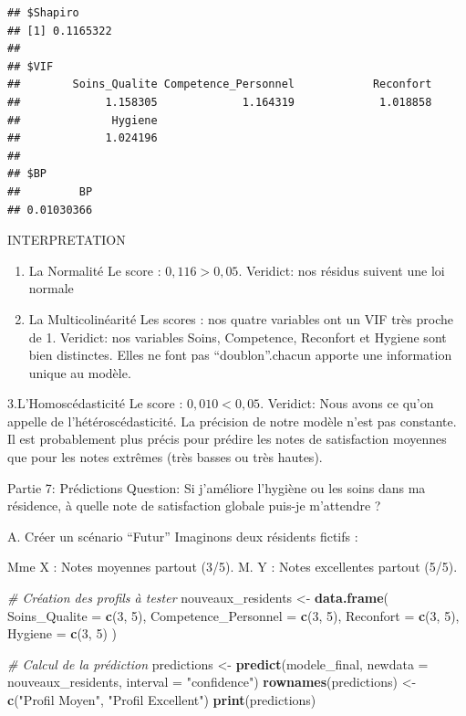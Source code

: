 \documentclass[
]{article}
\newenvironment{Shaded}{\begin{snugshade}}{\end{snugshade}}
\newcommand{\AttributeTok}[1]{\textcolor[rgb]{0.13,0.29,0.53}{#1}}
\newcommand{\CommentTok}[1]{\textcolor[rgb]{0.56,0.35,0.01}{\textit{#1}}}
\newcommand{\DecValTok}[1]{\textcolor[rgb]{0.00,0.00,0.81}{#1}}
\newcommand{\FunctionTok}[1]{\textcolor[rgb]{0.13,0.29,0.53}{\textbf{#1}}}
\newcommand{\NormalTok}[1]{#1}
\newcommand{\OtherTok}[1]{\textcolor[rgb]{0.56,0.35,0.01}{#1}}
\newcommand{\StringTok}[1]{\textcolor[rgb]{0.31,0.60,0.02}{#1}}
\begin{document}
\begin{verbatim}
## $Shapiro
## [1] 0.1165322
## 
## $VIF
##        Soins_Qualite Competence_Personnel            Reconfort 
##             1.158305             1.164319             1.018858 
##              Hygiene 
##             1.024196 
## 
## $BP
##         BP 
## 0.01030366
\end{verbatim}

INTERPRETATION

\begin{enumerate}
\def\labelenumi{\arabic{enumi}.}
\item
  La Normalité Le score : \(0,116 > 0,05\). Veridict: nos résidus
  suivent une loi normale
\item
  La Multicolinéarité Les scores : nos quatre variables ont un VIF très
  proche de 1. Veridict: nos variables Soins, Competence, Reconfort et
  Hygiene sont bien distinctes. Elles ne font pas ``doublon''.chacun
  apporte une information unique au modèle.
\end{enumerate}

3.L'Homoscédasticité Le score : \(0,010 < 0,05\). Veridict: Nous avons
ce qu'on appelle de l'hétéroscédasticité. La précision de notre modèle
n'est pas constante. Il est probablement plus précis pour prédire les
notes de satisfaction moyennes que pour les notes extrêmes (très basses
ou très hautes).

Partie 7: Prédictions Question: Si j'améliore l'hygiène ou les soins
dans ma résidence, à quelle note de satisfaction globale puis-je
m'attendre ?

A. Créer un scénario ``Futur'' Imaginons deux résidents fictifs :

Mme X : Notes moyennes partout (3/5). M. Y : Notes excellentes partout
(5/5).

\begin{Shaded}
\begin{Highlighting}[]
\CommentTok{\# Création des profils à tester}
\NormalTok{nouveaux\_residents }\OtherTok{\textless{}{-}} \FunctionTok{data.frame}\NormalTok{(}
  \AttributeTok{Soins\_Qualite =} \FunctionTok{c}\NormalTok{(}\DecValTok{3}\NormalTok{, }\DecValTok{5}\NormalTok{),}
  \AttributeTok{Competence\_Personnel =} \FunctionTok{c}\NormalTok{(}\DecValTok{3}\NormalTok{, }\DecValTok{5}\NormalTok{),}
  \AttributeTok{Reconfort =} \FunctionTok{c}\NormalTok{(}\DecValTok{3}\NormalTok{, }\DecValTok{5}\NormalTok{),}
  \AttributeTok{Hygiene =} \FunctionTok{c}\NormalTok{(}\DecValTok{3}\NormalTok{, }\DecValTok{5}\NormalTok{)}
\NormalTok{)}

\CommentTok{\# Calcul de la prédiction}
\NormalTok{predictions }\OtherTok{\textless{}{-}} \FunctionTok{predict}\NormalTok{(modele\_final, }\AttributeTok{newdata =}\NormalTok{ nouveaux\_residents, }\AttributeTok{interval =} \StringTok{"confidence"}\NormalTok{)}
\FunctionTok{rownames}\NormalTok{(predictions) }\OtherTok{\textless{}{-}} \FunctionTok{c}\NormalTok{(}\StringTok{"Profil Moyen"}\NormalTok{, }\StringTok{"Profil Excellent"}\NormalTok{)}
\FunctionTok{print}\NormalTok{(predictions)}
\end{Highlighting}
\end{Shaded}
\end{document}

